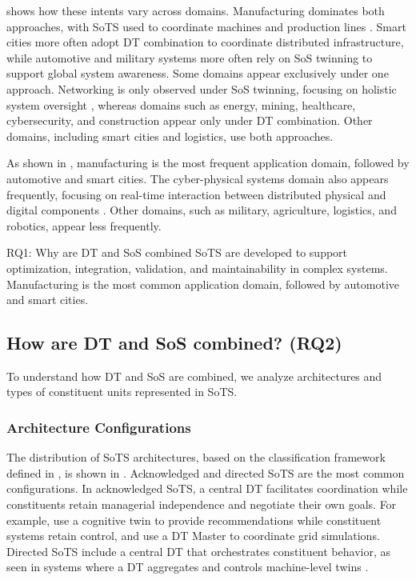  shows how these intents vary across domains. Manufacturing dominates both approaches, with SoTS used to coordinate machines and production lines \cite{villalonga2021decision-making, novak2022digitalized}. Smart cities more often adopt DT combination to coordinate distributed infrastructure, while automotive and military systems more often rely on SoS twinning to support global system awareness. Some domains appear exclusively under one approach. Networking is only observed under SoS twinning, focusing on holistic system oversight \cite{dobie2024network, priyanta2024is}, whereas domains such as energy, mining, healthcare, cybersecurity, and construction appear only under DT combination. Other domains, including smart cities and logistics, use both approaches.


As shown in , manufacturing is the most frequent application domain, followed by automotive and smart cities. The cyber-physical systems domain also appears frequently, focusing on real-time interaction between distributed physical and digital components \cite{alam2017c2ps, stary2022privacy}. Other domains, such as military, agriculture, logistics, and robotics, appear less frequently.

\begin{conclusionframe}{RQ1: Why are DT and SoS combined}
SoTS are developed to support optimization, integration, validation, and maintainability in complex systems. Manufacturing is the most common application domain, followed by automotive and smart cities.
\end{conclusionframe}

\subsection{How are DT and SoS combined? (RQ2)}\label{results-rq2}
To understand how DT and SoS are combined, we analyze architectures and types of constituent units represented in SoTS.

\subsubsection{Architecture Configurations}\label{sec:literature-review-architecture}

The distribution of SoTS architectures, based on the classification framework defined in , is shown in . Acknowledged and directed SoTS are the most common configurations. In acknowledged SoTS, a central DT facilitates coordination while constituents retain managerial independence and negotiate their own goals. For example, \textcite{li2022cognitive} use a cognitive twin to provide recommendations while constituent systems retain control, and \textcite{monsalve2021novel} use a DT Master to coordinate grid simulations. Directed SoTS include a central DT that orchestrates constituent behavior, as seen in systems where a DT aggregates and controls machine-level twins \cite{reiche2021digital, li2024comprehensive}.

